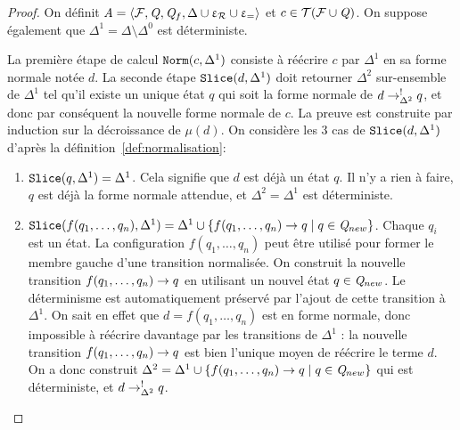 \begin{proof}
  On définit $\mathit A = \langle \mathcal{F}, \mathit Q, \mathit Q_f, \Delta \cup \upvarepsilon_{\mathcal R} \cup \upvarepsilon_{=}\rangle$ et $c \in \mathcal{ T(F \cup \mathit Q)}$.
  On suppose également que $\Delta^1 = \Delta \setminus \Delta^0$ est déterministe.

  La première étape de calcul $\mathtt{Norm}(c, \Delta^1)$ consiste à réécrire $c$ par
  $\Delta^1$ en sa forme normale notée $d$.   
  La seconde étape $\mathtt{Slice}(d, \Delta^1)$ doit retourner $\Delta^2$ sur-ensemble de $\Delta^1$
  tel qu'il existe un unique état $q$ qui soit la forme normale de $d \rightarrow^!_{\Delta^2} q$, et donc 
  par conséquent la nouvelle forme normale de $c$.
  La preuve est construite par induction sur la décroissance de $\mu(d)$.
  On considère les 3 cas de $\mathtt{Slice}(d, \Delta^1)$ d'après la définition~\ref{def:normalisation}:
   
  \begin{enumerate}
  \item $\mathtt{Slice}(q, \Delta^1) = \Delta^1$. Cela signifie que $d$ est déjà un état $q$. 
    Il n'y a rien à faire, $q$ est déjà la forme normale attendue,
    et $\Delta^2 = \Delta^1$ est déterministe.
  \item $\mathtt{Slice}(f(q_1, \dots, q_n), \Delta^1) = \Delta^1 \cup \{ f(q_1, \dots, q_n) \rightarrow q \; | \; q \in \mathit Q_{new}\}$. 
    Chaque $q_i$ est un état. La configuration $f(q_1, \dots, q_n)$ peut être utilisé pour former le membre gauche d'une transition
    normalisée. On construit la nouvelle transition $f(q_1, \dots, q_n) \rightarrow q$ en utilisant un nouvel état $q \in \mathit Q_{new}$. 
    Le déterminisme est automatiquement préservé par l'ajout de cette transition à $\Delta^1$. On sait en effet
    que $d = f(q_1, \dots, q_n)$ est en forme normale, donc impossible à réécrire davantage par les transitions de 
    $\Delta^1$ : la nouvelle transition $f(q_1, \dots, q_n) \rightarrow q$ est bien l'unique moyen de réécrire le terme $d$. On a donc construit
    $\Delta^2 = \Delta^1 \cup \{ f(q_1, \dots, q_n) \rightarrow q \; | \; q \in \mathit Q_{new}\}$ qui est déterministe, et $d \rightarrow^!_{\Delta^2} q$.
     

\end{enumerate}
\end{proof}
